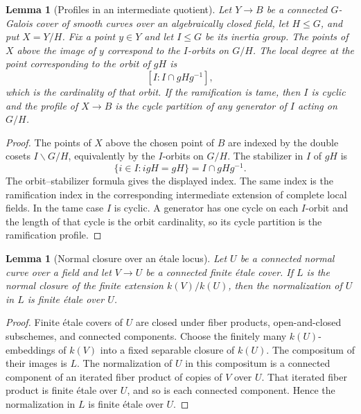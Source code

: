 \documentclass[10pt,a4paper]{amsart}
\newtheorem{lemma}[theorem]{Lemma}
\numberwithin{equation}{section}
\begin{document}
\begin{lemma}[Profiles in an intermediate quotient]
\label{lem:quotient-profile}
Let $Y\to B$ be a connected $G$-Galois cover of smooth curves over an
algebraically closed field, let $H\leq G$, and put $X=Y/H$.  Fix a point
$y\in Y$ and let $I\leq G$ be its inertia group.  The points of $X$ above
the image of $y$ correspond to the $I$-orbits on $G/H$.  The local degree at
the point corresponding to the orbit of $gH$ is
\[
 [I:I\cap gHg^{-1}],
\]
which is the cardinality of that orbit.  If the ramification is tame, then
$I$ is cyclic and the profile of $X\to B$ is the cycle partition of any
generator of $I$ acting on $G/H$.
\end{lemma}

\begin{proof}
The points of $X$ above the chosen point of $B$ are indexed by the double
cosets $I\backslash G/H$, equivalently by the $I$-orbits on $G/H$.  The
stabilizer in $I$ of $gH$ is
\[
 \{i\in I:igH=gH\}=I\cap gHg^{-1}.
\]
The orbit--stabilizer formula gives the displayed index.  The same index is
the ramification index in the corresponding intermediate extension of
complete local fields.  In the tame case $I$ is cyclic.  A generator has
one cycle on each $I$-orbit and the length of that cycle is the orbit
cardinality, so its cycle partition is the ramification profile.
\end{proof}

\begin{lemma}[Normal closure over an \'etale locus]
\label{lem:normal-closure-etale}
Let $U$ be a connected normal curve over a field and let $V\to U$ be a
connected finite \'etale cover.  If $L$ is the normal closure of the finite
extension $k(V)/k(U)$, then the normalization of $U$ in $L$ is finite
\'etale over $U$.
\end{lemma}

\begin{proof}
Finite \'etale covers of $U$ are closed under fiber products, open-and-closed
subschemes, and connected components.  Choose the finitely many
$k(U)$-embeddings of $k(V)$ into a fixed separable closure of $k(U)$.  The
compositum of their images is $L$.  The normalization of $U$ in this
compositum is a connected component of an iterated fiber product of copies
of $V$ over $U$.  That iterated fiber product is finite \'etale over $U$, and
so is each connected component.  Hence the normalization in $L$ is finite
\'etale over $U$.
\end{proof}
\end{document}
